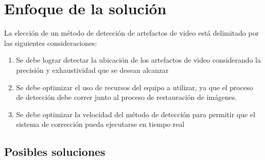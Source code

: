 
\chapter{Enfoque de la solución}
\label{chp:enfoque}

La elección de un método de detección de artefactos de video está delimitado por las siguientes consideraciones:
\begin{enumerate}
    \item Se debe lograr detectar la ubicación de los artefactos de video considerando la precisión y exhaustividad que se desean alcanzar
    \item Se debe optimizar el uso de recursos del equipo a utilizar, ya que el proceso de detección debe correr junto al proceso de restauración de imágenes.
    \item Se debe optimizar la velocidad del método de detección para permitir que el sistema de corrección pueda ejecutarse en tiempo real
\end{enumerate}

\section{Posibles soluciones}


